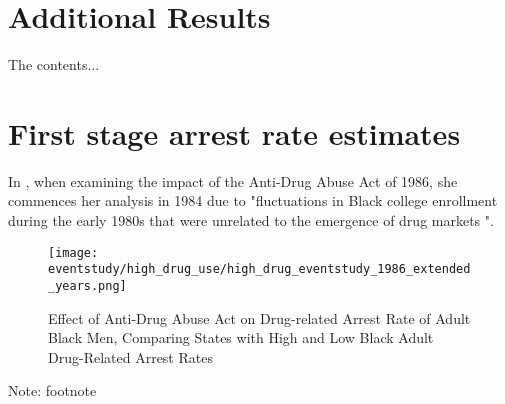 \documentclass{article}
\begin{document}
\clearpage
\nocite{*}
\singlespacing



\clearpage



\clearpage



\clearpage

\begin{appendices}
  \section{Additional Results}
  The contents...
  \section{First stage arrest rate estimates}
  In \cite{britton2022}, when examining the impact of the Anti-Drug Abuse Act of 1986, she commences her analysis in 1984 due to "fluctuations in Black college enrollment during the early 1980s that were unrelated to the emergence of drug markets \cite{nces}".
  \clearpage

  \begin{figure}[h]
    \caption{Effect of Anti-Drug Abuse Act on Drug-related Arrest Rate of Adult Black Men, Comparing States with High and Low Black Adult Drug-Related Arrest Rates}
    \centering
    \texttt{[image: eventstudy/high\_drug\_use/high\_drug\_eventstudy\_1986\_extended\_years.png]}
    \label{fig:b1}
  \end{figure}

  \begin{footnotesize}
    \noindent Note: footnote
  \end{footnotesize}


\end{appendices}
\end{document}
